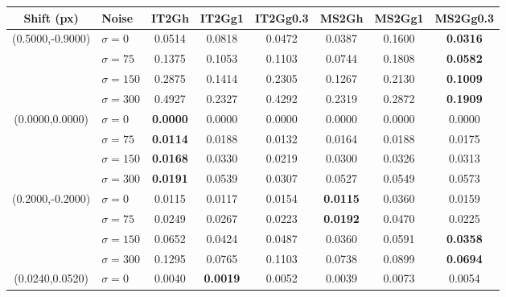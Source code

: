 \begin{table}[h!]%
	\centering
	\begin{tabular}{c |l||c|c|c|c|c|c}
		\scriptsize{\textbf{Shift (px)}} & \scriptsize{\textbf{Noise}} & \scriptsize{\textbf{IT2Gh}} & \scriptsize{\textbf{IT2Gg1}} & \scriptsize{\textbf{IT2Gg0.3}} & \scriptsize{\textbf{MS2Gh}} & \scriptsize{\textbf{MS2Gg1}} & \scriptsize{\textbf{MS2Gg0.3}}\\ \hline 
\multirow{4}{*}{(0.5000,-0.9000)} & $\sigma=0$ & 0.0514 & 0.0818 & 0.0472 & 0.0387 & 0.1600 & \textbf{0.0316} \\ 
 & $\sigma=75$ & 0.1375 & 0.1053 & 0.1103 & 0.0744 & 0.1808 & \textbf{0.0582} \\ 
 & $\sigma=150$ & 0.2875 & 0.1414 & 0.2305 & 0.1267 & 0.2130 & \textbf{0.1009} \\ 
 & $\sigma=300$ & 0.4927 & 0.2327 & 0.4292 & 0.2319 & 0.2872 & \textbf{0.1909} \\ 
 \hline
\multirow{4}{*}{(0.0000,0.0000)} & $\sigma=0$ & \textbf{0.0000} & 0.0000 & 0.0000 & 0.0000 & 0.0000 & 0.0000 \\ 
 & $\sigma=75$ & \textbf{0.0114} & 0.0188 & 0.0132 & 0.0164 & 0.0188 & 0.0175 \\ 
 & $\sigma=150$ & \textbf{0.0168} & 0.0330 & 0.0219 & 0.0300 & 0.0326 & 0.0313 \\ 
 & $\sigma=300$ & \textbf{0.0191} & 0.0539 & 0.0307 & 0.0527 & 0.0549 & 0.0573 \\ 
 \hline
\multirow{4}{*}{(0.2000,-0.2000)} & $\sigma=0$ & 0.0115 & 0.0117 & 0.0154 & \textbf{0.0115} & 0.0360 & 0.0159 \\ 
 & $\sigma=75$ & 0.0249 & 0.0267 & 0.0223 & \textbf{0.0192} & 0.0470 & 0.0225 \\ 
 & $\sigma=150$ & 0.0652 & 0.0424 & 0.0487 & 0.0360 & 0.0591 & \textbf{0.0358} \\ 
 & $\sigma=300$ & 0.1295 & 0.0765 & 0.1103 & 0.0738 & 0.0899 & \textbf{0.0694} \\ 
 \hline
\multirow{4}{*}{(0.0240,0.0520)} & $\sigma=0$ & 0.0040 & \textbf{0.0019} & 0.0052 & 0.0039 & 0.0073 & 0.0054 \\ 

\end{tabular}
\end{table}
